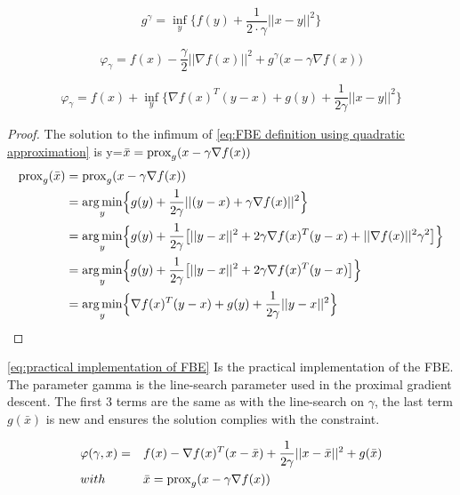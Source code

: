 		\begin{equation}
			g^{\gamma} = \underset{y}{\inf} \big \{f(y)+\frac{1}{2 \cdot \gamma}||x-y||^2 \big \}
			\label{eq:Moreau envelope}
		\end{equation}
		
		\begin{equation}
		\varphi_{\gamma} = f(x) - \frac{\gamma}{2}||\nabla f(x)||^2 + g^{\gamma} \big(x-\gamma \nabla f(x) \big)
		\label{eq:FBE definition using Moreau envelope}
		\end{equation}
		
		\begin{equation}
		\varphi_{\gamma} =   f(x) + \underset{y}{\inf} \Big\{ \nabla f(x)^T(y-x) + g(y) + \frac{1}{2 \gamma} ||x-y||^2  \Big\}
		\label{eq:FBE definition using quadratic approximation}
		\end{equation}
		
		\begin{proof}
			The solution to the infimum of \eqref{eq:FBE definition using quadratic approximation} is y=$\bar{x}= \operatorname{prox}_g(x-\gamma \nabla f(x))$
			\begin{align*}
			\operatorname{prox}_g(\bar{x}) 
			&=\operatorname{prox}_g(x- \gamma \nabla f(x)) \\
			&= \underset{y}{\operatorname*{arg\,min}} \Big \{ g(y) 
			+ \frac{1}{2 \gamma}||(y-x) + \gamma \nabla f(x)||^2 \Big \} \\
			&= \underset{y}{\operatorname*{arg\,min}} \Big \{ g(y) 
			+ \frac{1}{2 \gamma} \big[||y-x||^2 + 2 \gamma \nabla f(x)^T(y-x) + ||\nabla f(x)||^2\gamma^2 \big] \Big \} \\
			&= \underset{y}{\operatorname*{arg\,min}} \Big \{ g(y) 
			+ \frac{1}{2 \gamma} \big[||y-x||^2 + 2 \gamma \nabla f(x)^T(y-x)  \big] \Big \}\\
			&= \underset{y}{\operatorname*{arg\,min}} \Big \{   \nabla f(x)^T(y-x)  + g(y) 
			+ \frac{1}{2 \gamma} ||y-x||^2  \Big  \}
			\end{align*}
			\label{prf:prox is solution to FBE inf}
		\end{proof}
		
		\eqref{eq:practical implementation of FBE} Is the practical implementation of the FBE. The parameter gamma is the line-search parameter used in the proximal gradient descent. The first 3 terms are the same as with the line-search on $\gamma$, the last term $g(\bar{x})$ is new and ensures the solution complies with the constraint.
		
%		
		\begin{equation}
			\begin{aligned}	
				& \varphi(\gamma,x)= 
				&& f(x) - \nabla f(x)^T(x-\bar{x}) + \frac{1}{2 \gamma}||x-\bar{x}||^2  + g(\bar{x})
				\\
				& with 
				&&\bar{x} = \operatorname{prox}_g( x - \gamma\nabla f(x)) 
			\end{aligned} 
			\label{eq:practical implementation of FBE}
		\end{equation}
		
